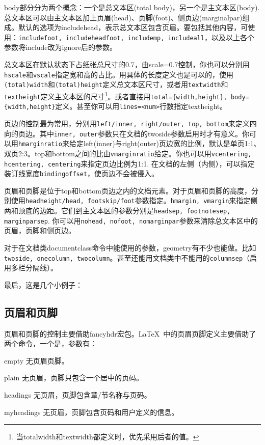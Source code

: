 body部分分为两个概念：一个是总文本区(total body)，另一个是主文本区(body). 总文本区可以由主文本区加上页眉(head)、页脚(foot)、侧页边(marginalpar)组成。默认的选项为includehead，表示总文本区包含页眉。要包括其他内容，可使用：\texttt{includefoot, includeheadfoot, includemp, includeall}，以及以上各个参数将include改为ignore后的参数。

总文本区在默认状态下占纸张总尺寸的0.7，由scale=0.7控制，你也可以分别用\texttt{hscale}和\texttt{vscale}指定宽和高的占比。用具体的长度定义也是可以的，使用\texttt{(total)width}和\texttt{(total)height}定义总文本区尺寸，或者用\texttt{textwidth}和\texttt{textheight}定义主文本区的尺寸\footnote{当totalwidth和textwidth都定义时，优先采用后者的值。}。或者直接用\texttt{total=\{width,height\}, body=\{width,height\}}定义。甚至你可以用\texttt{lines=<num>}行数指定textheight。

页边的控制最为常用，分别用\texttt{left/inner, right/outer, top, bottom}来定义四向的页边。其中\texttt{inner, outer}参数只在文档的twoside参数启用时才有意义。你可以用\texttt{hmarginratio}来给定left(inner)与right(outer)页边宽的比例，默认是单页1:1、双页2:3。top和bottom之间的比由\texttt{vmarginratio}给定。你也可以用\texttt{vcentering, hcentering, centering}来指定页边比例为1:1. 在文档的左侧（内侧），可以指定装订线宽度\texttt{bindingoffset}，使页边不会被侵入。

页眉和页脚是位于top和bottom页边之内的文档元素。对于页眉和页脚的高度，分别使用\texttt{headheight/head, footskip/foot}参数指定。\texttt{hmargin, vmargin}来指定侧两和顶底的边距。它们到主文本区的参数分别是\texttt{headsep, footnotesep, marginparsep}. 你可以用\texttt{nohead, nofoot, nomarginpar}参数来清除总文本区中的页眉，页脚和侧页边。

对于在文档类documentclass命令中能使用的参数，geometry有不少也能做。比如\texttt{twoside, onecolumn, twocolumn}。甚至还能用文档类中不能用的\texttt{columnsep}（启用多栏分隔线）。

最后，这是几个小例子：
\begin{latex}
\usepackage[hmargin=1.25in,vmargin=1in]{geometry}
\usepackage[inner=1in,outer=1.25in]{geometry}
\end{latex}

\subsection{页眉和页脚}
页眉和页脚的控制主要借助fancyhdr宏包。\LaTeX\ 中的页眉页脚定义主要借助了两个命令，一个是，参数有：
\begin{para}
\item[empty] 无页眉页脚。
\item[plain] 无页眉，页脚只包含一个居中的页码。
\item[headings] 无页眉，页脚包含章/节名称与页码。
\item[myheadings] 无页眉，页脚包含页码和用户定义的信息。
\end{para}

